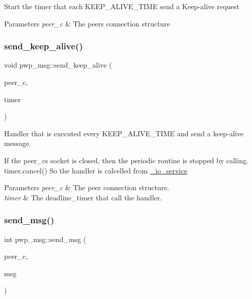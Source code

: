 Start the timer that each K\+E\+E\+P\+\_\+\+A\+L\+I\+V\+E\+\_\+\+T\+I\+ME send a Keep-\/alive request


\begin{DoxyParams}{Parameters}
{\em peer\+\_\+c} & The peer\textquotesingle{}s connection structure \\
\hline
\end{DoxyParams}
\mbox{\label{namespacepwp__msg_a9a577f5a53b823d83bb4694f1ebf141e}} 
\subsubsection{\texorpdfstring{send\+\_\+keep\+\_\+alive()}{send\_keep\_alive()}}
{\footnotesize\ttfamily void pwp\+\_\+msg\+::send\+\_\+keep\+\_\+alive (\begin{DoxyParamCaption}\item[{const \hyperlink{structpwp_1_1peer__connection}{pwp\+::peer\+\_\+connection} \&}]{peer\+\_\+c,  }\item[{boost\+::asio\+::deadline\+\_\+timer \&}]{timer }\end{DoxyParamCaption})}

Handler that is executed every K\+E\+E\+P\+\_\+\+A\+L\+I\+V\+E\+\_\+\+T\+I\+ME and send a keep-\/alive message.

If the peer\+\_\+c\textquotesingle{}s socket is closed, then the periodic routine is stopped by calling.~\newline
 {\ttfamily timer.\+cancel()} So the handler is calcelled from \hyperlink{pwp_8hpp_a7efe93eb3d4e0f0c9ab96fa5ae443fcd}{\+\_\+io\+\_\+service}


\begin{DoxyParams}{Parameters}
{\em peer\+\_\+c} & The peer connection structure. \\
\hline
{\em timer} & The deadline\+\_\+timer that call the handler. \\
\hline
\end{DoxyParams}
\mbox{\label{namespacepwp__msg_aca807c6281879abef952f8feecccb6e8}} 
\subsubsection{\texorpdfstring{send\+\_\+msg()}{send\_msg()}}
{\footnotesize\ttfamily int pwp\+\_\+msg\+::send\+\_\+msg (\begin{DoxyParamCaption}\item[{\hyperlink{structpwp_1_1peer__connection}{pwp\+::peer\+\_\+connection} \&}]{peer\+\_\+c,  }\item[{std\+::vector$<$ uint8\+\_\+t $>$}]{msg }\end{DoxyParamCaption})}



